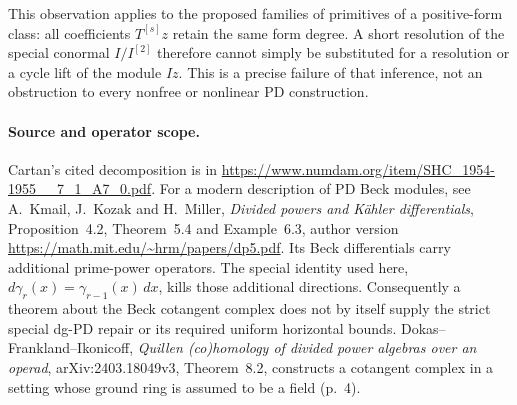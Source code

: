This observation applies to the proposed families of primitives
of a positive-form class: all coefficients \(T^{[s]}z\) retain
the same form degree. A short resolution of the special conormal
\(I/I^{[2]}\) therefore cannot simply be substituted for a
resolution or a cycle lift of the module \(I z\). This is a
precise failure of that inference, not an obstruction to every
nonfree or nonlinear PD construction.

\paragraph{Source and operator scope.}
Cartan's cited decomposition is in
\url{https://www.numdam.org/item/SHC_1954-1955__7_1_A7_0.pdf}.
For a modern description of PD Beck modules, see A.~Kmail,
J.~Kozak and H.~Miller, \emph{Divided powers and K\"ahler differentials},
Proposition~4.2, Theorem~5.4 and Example~6.3, author version
\url{https://math.mit.edu/~hrm/papers/dp5.pdf}.
Its Beck differentials carry additional prime-power operators.
The special identity used here,
\(d\gamma_r(x)=\gamma_{r-1}(x)\,dx\), kills those additional
directions. Consequently a theorem about the Beck cotangent complex
does not by itself supply the strict special dg-PD repair or its
required uniform horizontal bounds. Dokas--Frankland--Ikonicoff,
\emph{Quillen (co)homology of divided power algebras over an operad},
arXiv:2403.18049v3, Theorem~8.2, constructs a cotangent complex in a
setting whose ground ring is assumed to be a field (p.~4).

